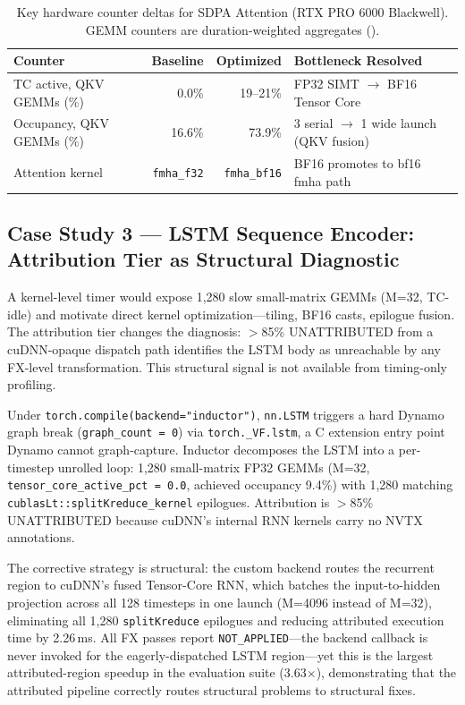 \begin{table}[h]
\centering
\caption{Key hardware counter deltas for SDPA Attention (RTX PRO 6000 Blackwell).
  GEMM counters are duration-weighted aggregates ().}
\label{tab:sdpa_counters}
\small
\setlength{\tabcolsep}{4pt}
\begin{tabular}{lrrl}
\toprule
\textbf{Counter} & \textbf{Baseline} & \textbf{Optimized} & \textbf{Bottleneck Resolved} \\
\midrule
TC active, QKV GEMMs (\%)  & 0.0\%  & 19--21\% & FP32 SIMT $\to$ BF16 Tensor Core \\
Occupancy, QKV GEMMs (\%)  & 16.6\% & 73.9\%   & 3 serial $\to$ 1 wide launch (QKV fusion) \\
Attention kernel            & \texttt{fmha\_f32} & \texttt{fmha\_bf16} & BF16 promotes to bf16 fmha path \\
\bottomrule
\end{tabular}
\end{table}

\subsection{Case Study 3 --- LSTM Sequence Encoder: Attribution Tier as Structural Diagnostic}
\label{sec:cs:lstm}

A kernel-level timer would expose 1{,}280 slow small-matrix GEMMs (M=32, TC-idle) and
motivate direct kernel optimization---tiling, BF16 casts, epilogue fusion.  The attribution
tier changes the diagnosis: $>$85\% UNATTRIBUTED from a cuDNN-opaque dispatch path identifies
the LSTM body as unreachable by any FX-level transformation.  This structural signal is not
available from timing-only profiling.

Under \texttt{torch.compile(\allowbreak backend="inductor")}, \texttt{nn.LSTM} triggers a hard Dynamo
graph break (\texttt{graph\_count = 0}) via \texttt{torch.\_VF.lstm}, a C extension entry
point Dynamo cannot graph-capture.  Inductor decomposes the LSTM into a per-timestep unrolled
loop: 1,280 small-matrix FP32 GEMMs (M=32, \texttt{tensor\_core\_active\_pct = 0.0},
achieved occupancy 9.4\%) with 1,280 matching \texttt{cublasLt::\allowbreak splitKreduce\_kernel}
epilogues.  Attribution is $>$85\% UNATTRIBUTED because cuDNN's internal RNN kernels carry no
NVTX annotations.

The corrective strategy is structural: the custom backend routes the recurrent region to
cuDNN's fused Tensor-Core RNN, which batches the input-to-hidden projection across all 128
timesteps in one launch (M=4096 instead of M=32), eliminating all 1,280
\texttt{splitKreduce} epilogues and reducing attributed execution time by 2.26\,ms.  All FX
passes report \texttt{NOT\_APPLIED}---the backend callback is never invoked for the
eagerly-dispatched LSTM region---yet this is the largest attributed-region speedup in the
evaluation suite (3.63$\times$), demonstrating that the attributed pipeline correctly routes
structural problems to structural fixes.

